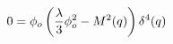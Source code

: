 \begin{equation}
\label{trenta}
0= \phi_o \left ( {\lambda \over 3} \phi_o^2  -  M^2(q)\right ) \delta^4 (q) 
\end{equation}

